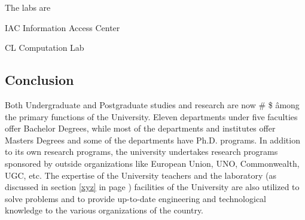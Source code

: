 \documentclass[a4paper,12pt,oneside]{article}
\begin{document}
The labs are
\begin{description}
\item{IAC} Information Access Center
\item{CL} Computation Lab
\end{description}

\subsection{Conclusion}	
Both Undergraduate and Postgraduate studies and research are now \# \$ \^ among the primary functions of the University. Eleven departments under five faculties offer Bachelor Degrees, while most of the departments and institutes offer Masters Degrees and some of the departments have Ph.D. programs. In addition to its own research programs, the university undertakes research programs sponsored by outside organizations like European Union, UNO, Commonwealth, UGC, etc. The expertise of the University teachers and the laboratory (as discussed in section \ref{xyz} in page \pageref{xyz}) facilities of the University are also utilized to solve problems and to provide up-to-date engineering and technological knowledge to the various organizations of the country.
\end{document}
